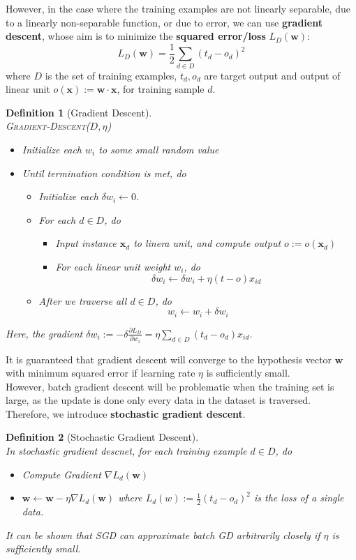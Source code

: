 \documentclass[12pt]{article}
\newtheorem{definition}{Definition}[section]
\theoremstyle{definition}
\begin{document}
However, in the case where the training examples are not linearly separable, due to a linearly non-separable function, or due to error, we can use \textbf{gradient descent}, whose aim is to minimize the \textbf{squared error/loss} $L_D(\mathbf{w})$:
\[
L_D(\mathbf{w})=\frac{1}{2}\sum_{d\in D}(t_d-o_d)^2
\]
where $D$ is the set of training examples, $t_d, o_d$ are target output and output of linear unit $o(\mathbf{x}):=\mathbf{w}\cdot \mathbf{x}$, for training sample $d$.
\begin{definition}[Gradient Descent]
\hfill\\\normalfont \textsc{Gradient-Descent}($D,\eta$)\\
\begin{itemize}
\item Initialize each $w_i$ to some small random value
\item Until termination condition is met, do
\begin{itemize}
\item Initialize each $\delta w_i\leftarrow 0$.
\item For each $d\in D$, do
\begin{itemize}
\item Input instance $\mathbf{x}_d$ to linera unit, and compute output $o:=o(\mathbf{x}_d)$
\item For each linear unit weight $w_i$, do
\[
\delta w_i\leftarrow \delta w_i + \eta(t-o)x_{id}
\]
\end{itemize}
\item After we traverse all $d\in D$, do
\[
w_i\leftarrow w_i+\delta w_i
\]
\end{itemize}
\end{itemize}
Here, the gradient $\delta w_i:=-\delta \frac{\partial L_D}{\partial w_i}=\eta\sum_{d\in D}(t_d-o_d)x_{id}$.
\end{definition}
It is guaranteed that gradient descent will converge to the hypothesis vector $\mathbf{w}$ with minimum squared error if learning rate $\eta$ is sufficiently small.\\
However, batch gradient descent will be problematic when the training set is large, as the update is done only every data in the dataset is traversed. Therefore, we introduce \textbf{stochastic gradient descent}.
\begin{definition}[Stochastic Gradient Descent]
\hfill\\\normalfont In stochastic gradient descnet, for each training example $d\in D$, do
\begin{itemize}
	\item Compute Gradient $\nabla L_d(\mathbf{w})$
	\item $\mathbf{w}\leftarrow \mathbf{w}-\eta\nabla L_d(\mathbf{w})$ where $L_d(w):=\frac{1}{2}(t_d-o_d)^2$ is the loss of a single data.
\end{itemize}
It can be shown that SGD can approximate batch GD arbitrarily closely if $\eta$ is sufficiently small.
\end{definition}
\end{document}
